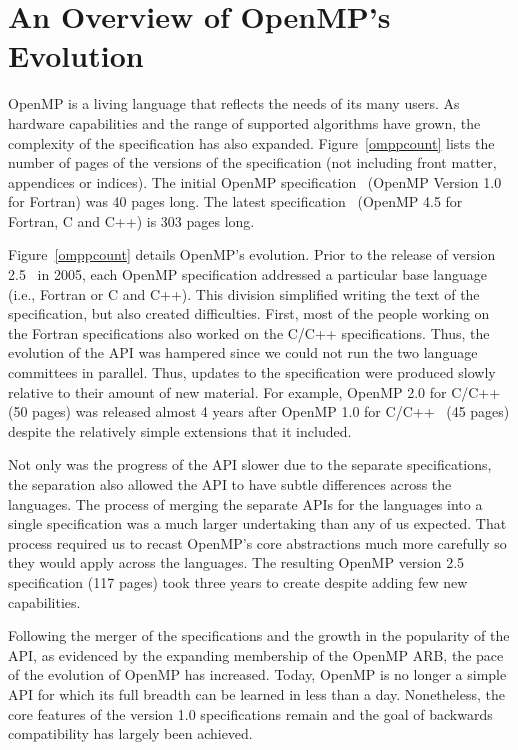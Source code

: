 \section{An Overview of OpenMP's Evolution}
\label{sec:evolve}

OpenMP is a living language that reflects the needs of its many users. 
As hardware capabilities and the range of supported algorithms have 
grown, the complexity of the specification has also expanded. 
Figure~\ref{omppcount} lists the number of pages of the versions of 
the specification (not including front matter, appendices or indices).   
The initial OpenMP specification~\cite{openmp1f} (OpenMP Version 1.0 for
Fortran) was 40 pages long. The latest specification~\cite{openmp45} (OpenMP 4.5
for Fortran, C and C++) is 303 pages long.

Figure~\ref{omppcount} details OpenMP's evolution. Prior to the release 
of version 2.5~\cite{openmp25} in 2005, each OpenMP specification addressed 
a particular base language (i.e., Fortran or C and C++). This division 
simplified writing the text of the specification, but also created 
difficulties. First, most of the people working on the Fortran specifications 
also worked on the C/C++ specifications. Thus, the evolution of the API was 
hampered since we could not run the two language committees in parallel. Thus,
updates to the specification were produced slowly relative to their amount of 
new material. For example, OpenMP 2.0 for C/C++~\cite{openmp2c} (50 pages) 
was released almost 4 years after OpenMP 1.0 for C/C++~\cite{openmp1c} (45 
pages) despite the relatively simple extensions that it included. 

Not only was the progress of the API slower due to the separate 
specifications, the separation also allowed the API to have subtle 
differences across the languages. The process of merging the separate
APIs for the languages into a single  specification was a much larger 
undertaking than any of us expected. That process required us to recast 
OpenMP's core abstractions much more carefully so they would apply across 
the languages. The resulting OpenMP version 2.5 specification (117 pages)
took three years to create despite adding few new capabilities.

Following the merger of the specifications and the growth in the popularity
of the API, as evidenced by the expanding membership of the OpenMP ARB,
the pace of the evolution of OpenMP has increased. Today, OpenMP is no 
longer a simple API for which its full breadth can be learned in less 
than a day. Nonetheless, the core features of the version 1.0 specifications
remain and the goal of backwards compatibility has largely been achieved.

